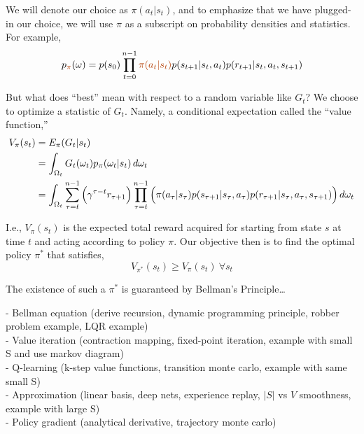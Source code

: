 We will denote our choice as $\pi(a_t|s_t)$, and to emphasize that we have plugged-in our choice, we will use $\pi$ as a subscript on probability densities and statistics. For example,
\begin{equation*}
p_{\orange{\pi}}(\omega) = p(s_0) \prod_{t=0}^{n-1} \orange{\pi(a_t|s_t)}p(s_{t+1}|s_t,a_t)p(r_{t+1}|s_t,a_t,s_{t+1})
\end{equation*}

But what does ``best'' mean with respect to a random variable like $G_t$? We choose to optimize a statistic of $G_t$. Namely, a conditional expectation called the ``value function,''
\begin{align*}
V_\pi(s_t) &= E_\pi(G_t | s_t)\\
&= \int_{\Omega_t} G_t(\omega_t) p_\pi(\omega_t|s_t)\,d\omega_t\\
&= \int_{\Omega_t} \sum_{\tau=t}^{n-1} \Big{(}\gamma^{\tau-t} r_{\tau+1}\Big{)} \prod_{\tau=t}^{n-1} \Big{(}\pi(a_\tau|s_\tau)p(s_{\tau+1}|s_\tau,a_\tau)p(r_{\tau+1}|s_\tau,a_\tau,s_{\tau+1})\Big{)} \,d\omega_t
\end{align*}

I.e., $V_\pi(s_t)$ is the expected total reward acquired for starting from state $s$ at time $t$ and acting according to policy $\pi$. Our objective then is to find the optimal policy $\pi^*$ that satisfies,
\begin{equation*}
V_{\pi^*}(s_t) \geq V_{\pi}(s_t)\ \forall s_t
\end{equation*}

The existence of such a $\pi^*$ is guaranteed by Bellman's Principle\ldots

\vspace{0.3in}

- Bellman equation (derive recursion, dynamic programming principle, robber problem example, LQR example)\\

- Value iteration (contraction mapping, fixed-point iteration, example with small S and use markov diagram)\\

- Q-learning (k-step value functions, transition monte carlo, example with same small S)\\

- Approximation (linear basis, deep nets, experience replay, $|S|$ vs $V$ smoothness, example with large S)\\

- Policy gradient (analytical derivative, trajectory monte carlo)\\

